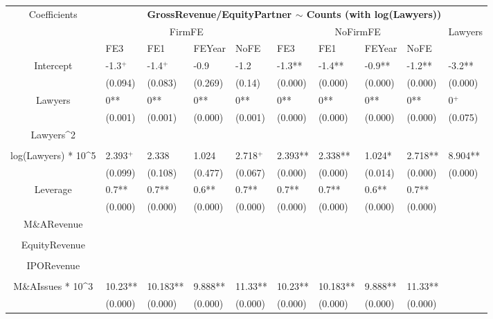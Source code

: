 \documentclass{article}
\begin{document}
\begin{table}[H]
\centering
\begin{tabular}{|clllllllll|}
\hline
\multirow{3}{*}{Coefficients} & \multicolumn{9}{c|}{\textbf{GrossRevenue/EquityPartner $\sim$ Counts (with log(Lawyers))}} \\
\cline{2-10}
& \multicolumn{4}{c}{FirmFE} & \multicolumn{4}{c}{NoFirmFE} & \multirow{2}{*}{Lawyers} \\
\cline{2-9}
& FE3 & FE1 & FEYear & NoFE & FE3 & FE1 & FEYear & NoFE &  \\
\hline
 
Intercept & -1.3$^{+}$ & -1.4$^{+}$ & -0.9 & -1.2 & -1.3** & -1.4** & -0.9** & -1.2** & -3.2** \\ 
   & (0.094) & (0.083) & (0.269) & (0.14) & (0.000) & (0.000) & (0.000) & (0.000) & (0.000) \\ 
  Lawyers & 0** & 0** & 0** & 0** & 0** & 0** & 0** & 0** & 0$^{+}$ \\ 
   & (0.001) & (0.001) & (0.000) & (0.001) & (0.000) & (0.000) & (0.000) & (0.000) & (0.075) \\ 
  Lawyers^2 &  &  &  &  &  &  &  &  &  \\ 
   &  &  &  &  &  &  &  &  &  \\ 
  log(Lawyers) * 10^5 & 2.393$^{+}$ & 2.338 & 1.024 & 2.718$^{+}$ & 2.393** & 2.338** & 1.024* & 2.718** & 8.904** \\ 
   & (0.099) & (0.108) & (0.477) & (0.067) & (0.000) & (0.000) & (0.014) & (0.000) & (0.000) \\ 
  Leverage & 0.7** & 0.7** & 0.6** & 0.7** & 0.7** & 0.7** & 0.6** & 0.7** &  \\ 
   & (0.000) & (0.000) & (0.000) & (0.000) & (0.000) & (0.000) & (0.000) & (0.000) &  \\ 
  M\&ARevenue &  &  &  &  &  &  &  &  &  \\ 
   &  &  &  &  &  &  &  &  &  \\ 
  EquityRevenue &  &  &  &  &  &  &  &  &  \\ 
   &  &  &  &  &  &  &  &  &  \\ 
  IPORevenue &  &  &  &  &  &  &  &  &  \\ 
   &  &  &  &  &  &  &  &  &  \\ 
  M\&AIssues * 10^3 & 10.23** & 10.183** & 9.888** & 11.33** & 10.23** & 10.183** & 9.888** & 11.33** &  \\ 
   & (0.000) & (0.000) & (0.000) & (0.000) & (0.000) & (0.000) & (0.000) & (0.000) &  \\ 

\end{tabular}
\end{table}
\end{document}
